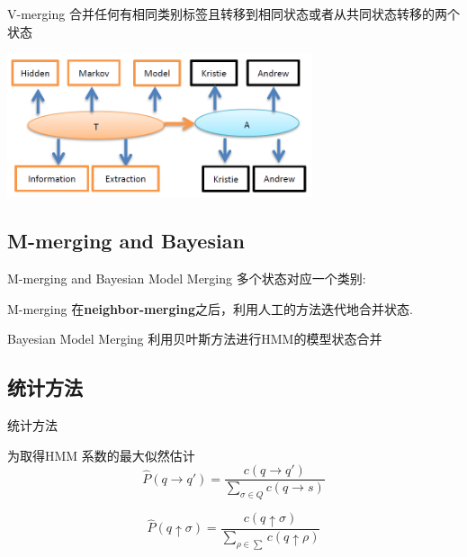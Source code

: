 \documentclass{beamer}
\begin{document}
\begin{frame}{V-merging}
    合并任何有相同类别标签且转移到相同状态或者从共同状态转移的两个状态
    \begin{center}
        \includegraphics[height=120pt]{report5/v-merge-2.png}
    \end{center}
\end{frame}

\subsection{M-merging and Bayesian}
\begin{frame}{M-merging and Bayesian Model Merging}
多个状态对应一个类别:
\begin{block}{M-merging}
    在\textbf{neighbor-merging}之后，利用人工的方法迭代地合并状态.    
\end{block}

\begin{block}{Bayesian Model Merging}
    利用贝叶斯方法进行HMM的模型状态合并
\end{block}
\end{frame}

\subsection{统计方法}
\begin{frame}{统计方法}
    \begin{block}{ 为取得HMM 系数的最大似然估计}
    \begin{equation}
        \hat{P}(q \rightarrow q') = 
        \frac{c(q \rightarrow q')}
        {\sum_{\sigma \in Q}{c(q \rightarrow s)}}
    \end{equation}

    \begin{equation}
        \hat{P}(q \uparrow \sigma) = 
        \frac{c(q\uparrow \sigma)}
        {\sum_{\rho \in \sum}{c(q \uparrow \rho)}}
    \end{equation}
    \end{block}
\end{frame}
\end{document}
